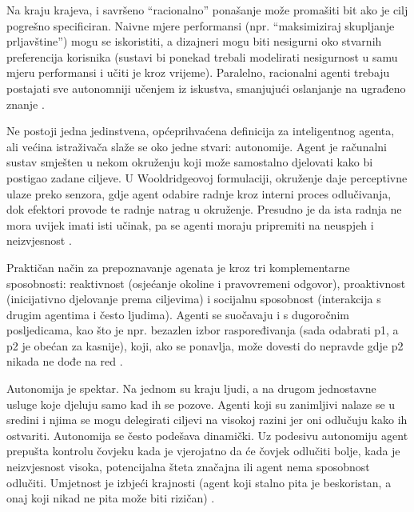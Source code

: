 \documentclass[]{foi}
\begin{document}
Na kraju krajeva, i savršeno “racionalno” ponašanje može promašiti bit ako je cilj pogrešno specificiran. Naivne mjere performansi (npr. “maksimiziraj skupljanje prljavštine”) mogu se 
iskoristiti, a dizajneri mogu biti nesigurni oko stvarnih preferencija korisnika (sustavi bi ponekad trebali modelirati nesigurnost u samu mjeru performansi i učiti je kroz vrijeme). 
Paralelno, racionalni agenti trebaju postajati sve autonomniji učenjem iz iskustva, smanjujući oslanjanje na ugrađeno znanje \cite[str. 57 i 58]{russell2022ai}.

Ne postoji jedna jedinstvena, općeprihvaćena definicija za inteligentnog agenta, ali većina istraživača slaže se oko jedne stvari: autonomije. Agent je računalni sustav smješten u nekom 
okruženju koji može samostalno djelovati kako bi postigao zadane ciljeve. U Wooldridgeovoj formulaciji, okruženje daje perceptivne ulaze preko senzora, gdje agent odabire radnje kroz interni 
proces odlučivanja, dok efektori provode te radnje natrag u okruženje. Presudno je da ista radnja ne mora uvijek imati isti učinak, pa se agenti moraju pripremiti na neuspjeh i neizvjesnost
\cite[str. 40]{wooldridge2009multiagent}.

Praktičan način za prepoznavanje agenata je kroz tri komplementarne sposobnosti: reaktivnost (osjećanje okoline i pravovremeni odgovor), proaktivnost (inicijativno djelovanje prema ciljevima) 
i socijalnu sposobnost (interakcija s drugim agentima i često ljudima). Agenti se suočavaju i s dugoročnim posljedicama, kao što je npr. bezazlen izbor raspoređivanja (sada odabrati p1, a p2 
je obećan za kasnije), koji, ako se ponavlja, može dovesti do nepravde gdje p2 nikada ne dođe na red \cite[str. 45]{wooldridge2009multiagent}.

Autonomija je spektar. Na jednom su kraju ljudi, a na drugom jednostavne usluge koje djeluju samo kad ih se pozove. Agenti koji su zanimljivi nalaze se u sredini i njima se mogu delegirati 
ciljevi na visokoj razini jer oni odlučuju kako ih ostvariti. Autonomija se često podešava dinamički. Uz podesivu autonomiju agent prepušta kontrolu čovjeku kada je vjerojatno da će čovjek 
odlučiti bolje, kada je neizvjesnost visoka, potencijalna šteta značajna ili agent nema sposobnost odlučiti. Umjetnost je izbjeći krajnosti (agent koji stalno pita je beskoristan, a onaj 
koji nikad ne pita može biti rizičan) \cite[str. 41 i 42]{wooldridge2009multiagent}.
\end{document}
